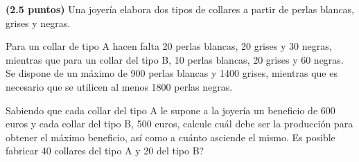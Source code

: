 
\textbf{(2.5 puntos)} Una joyería elabora dos tipos de collares a partir de perlas blancas, grises y negras.

Para un collar de tipo A hacen falta 20 perlas blancas, 20 grises y 30 negras, mientras que para un collar del tipo B, 10 perlas blancas, 20 grises y 60 negras. Se dispone de un máximo de 900 perlas blancas y 1400 grises, mientras que es necesario que se utilicen al menos 1800 perlas negras.

Sabiendo que cada collar del tipo A le supone a la joyería un beneficio de 600 euros y cada collar del tipo B, 500 euros, calcule cuál debe ser la producción para obtener el máximo beneficio, así como a cuánto asciende el mismo. \textquestiondown{}Es posible fabricar 40 collares del tipo A y 20 del tipo B?

